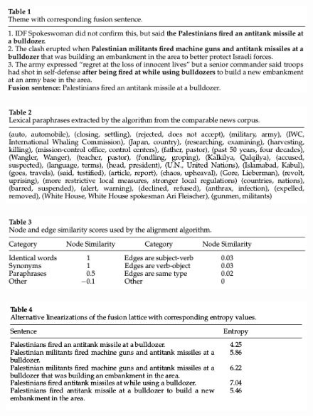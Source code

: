 \documentclass[xcolor={table}]{beamer}
\begin{document}
\begin{frame}[t]{\cite{barzilay2005sentence}}
      \begin{figure}[h]
          \centering
      \includegraphics[scale=.25]{images/table1-barzilay05.png} \\
  \end{figure}
\end{frame}
\begin{frame}[t]{\cite{barzilay2005sentence}}
      \begin{figure}[h]
          \centering
      \includegraphics[scale=.25]{images/table2-barzilay05.png} \\
  \end{figure}
\end{frame}
\begin{frame}[t]{\cite{barzilay2005sentence}}
      \begin{figure}[h]
          \centering
      \includegraphics[scale=.25]{images/table3-barzilay05.png} \\
  \end{figure}
\end{frame}
\begin{frame}[t]{\cite{barzilay2005sentence}}
      \begin{figure}[h]
          \centering
      \includegraphics[scale=.3]{images/table4-barzilay05.png} \\
  \end{figure}
\end{frame}
\end{document}
